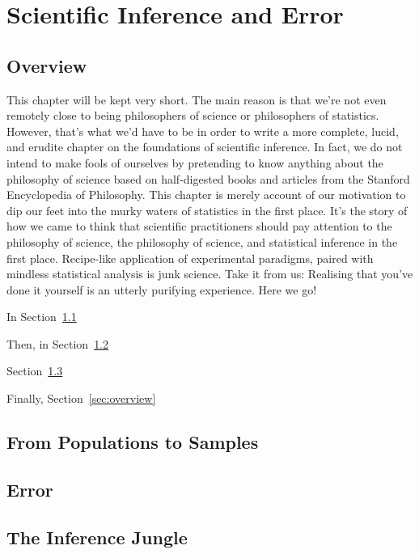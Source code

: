 \chapter{Scientific Inference and Error}
\label{sec:inference}

\section*{Overview}

This chapter will be kept very short.
The main reason is that we're not even remotely close to being philosophers of science or philosophers of statistics.
However, that's what we'd have to be in order to write a more complete, lucid, and erudite chapter on the foundations of scientific inference.
In fact, we do not intend to make fools of ourselves by pretending to know anything about the philosophy of science based on half-digested books and articles from the Stanford Encyclopedia of Philosophy.
This chapter is merely account of our motivation to dip our feet into the murky waters of statistics in the first place.
It's the story of how we came to think that scientific practitioners should pay attention to the philosophy of science, the philosophy of science, and statistical inference in the first place.
Recipe-like application of experimental paradigms, paired with mindless statistical analysis is junk science.
Take it from us:
Realising that you've done it yourself is an utterly purifying experience.
Here we go!

In Section~\ref{sec:popsamples}

Then, in Section~\ref{sec:error}

Section~\ref{sec:jungle}

Finally, Section~\ref{sec:overview}

\section{From Populations to Samples}\label{sec:popsamples}

%
%

\section{Error}\label{sec:error}

\section{The Inference Jungle}\label{sec:jungle}

